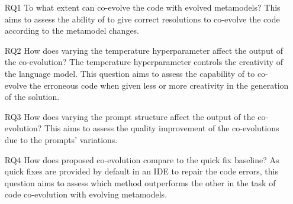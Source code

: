 \begin{itemize}
    \item[RQ1] %
    To what extent can \LLM co-evolve the code with evolved metamodels? 
    This aims to assess the ability of \LLM to give correct resolutions to co-evolve the code according to the metamodel changes.
    
    \item[RQ2] %
    How does varying the temperature hyperparameter affect the output of the co-evolution? %
    The temperature hyperparameter controls the creativity of the language model. 
    This question aims to assess the capability of \LLM to co-evolve the erroneous code when given less or more creativity in the generation of the solution. 
    
    
    \item[RQ3] %
    How does varying the prompt structure affect the output of the co-evolution? %
    This aims to assess the quality improvement of the co-evolutions due to the prompts' variations.
    

    \item[RQ4] %
    How does \LLM proposed co-evolution compare to the quick fix baseline? 
    As quick fixes are provided by default in an IDE to repair the code errors, this question aims to assess which method outperforms the other in the task of code co-evolution with evolving metamodels. %

    
\end{itemize}



